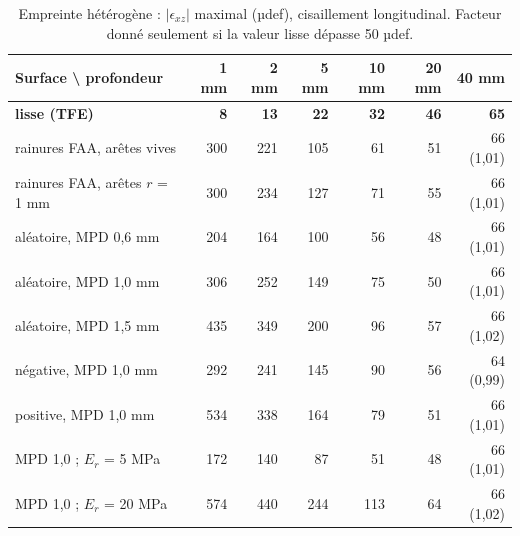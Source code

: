 \begin{table}[H]\centering\footnotesize
\caption{Empreinte hétérogène : $|\epsilon_{xz}|$ maximal (µdef), cisaillement longitudinal. Facteur donné seulement si la valeur lisse dépasse 50 µdef.}\label{tab:het_exz}
\begin{tabular}{lrrrrrr}
\toprule
Surface \textbackslash{} profondeur & 1 mm & 2 mm & 5 mm & 10 mm & 20 mm & 40 mm\\
\midrule
\textbf{lisse (TFE)} & \textbf{8} & \textbf{13} & \textbf{22} & \textbf{32} & \textbf{46} & \textbf{65}\\ \midrule
rainures FAA, arêtes vives & 300 & 221 & 105 & 61 & 51 & 66 (1,01)\\
rainures FAA, arêtes $r$ = 1 mm & 300 & 234 & 127 & 71 & 55 & 66 (1,01)\\
aléatoire, MPD 0,6 mm & 204 & 164 & 100 & 56 & 48 & 66 (1,01)\\
aléatoire, MPD 1,0 mm & 306 & 252 & 149 & 75 & 50 & 66 (1,01)\\
aléatoire, MPD 1,5 mm & 435 & 349 & 200 & 96 & 57 & 66 (1,02)\\
négative, MPD 1,0 mm & 292 & 241 & 145 & 90 & 56 & 64 (0,99)\\
positive, MPD 1,0 mm & 534 & 338 & 164 & 79 & 51 & 66 (1,01)\\
MPD 1,0 ; $E_r$ = 5 MPa & 172 & 140 & 87 & 51 & 48 & 66 (1,01)\\
MPD 1,0 ; $E_r$ = 20 MPa & 574 & 440 & 244 & 113 & 64 & 66 (1,02)\\
\bottomrule
\end{tabular}
\end{table}

